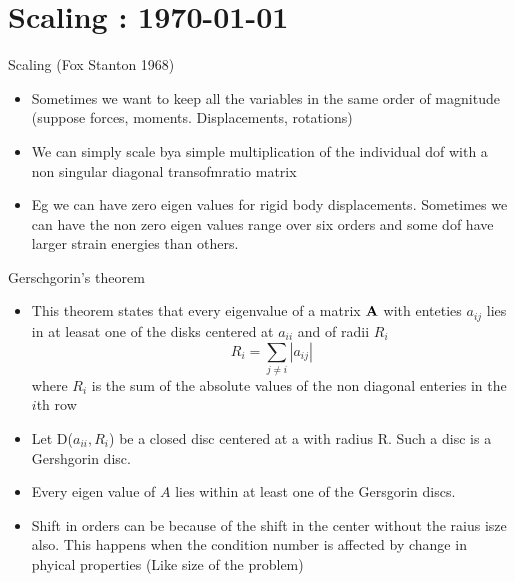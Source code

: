 




	\tableofcontents
	
\section{Scaling : \today}

	\begin{frame}{Scaling (Fox Stanton 1968)}
		\begin{itemize}
			\item Sometimes we want to keep all the variables in the same order of magnitude (suppose forces, moments. Displacements, rotations)
			\item We can simply scale  bya  simple multiplication of the individual dof with a non singular diagonal transofmratio matrix
			\item Eg we can have zero eigen values for rigid body displacements. Sometimes we can have the non zero eigen values range over six orders and some dof have larger strain energies than others.
		\end{itemize}
\texttt{}	\end{frame}

	\begin{frame}{Gerschgorin's theorem}
		\begin{itemize}
			\item This theorem states that every eigenvalue of a matrix $\mathbf{A}$ with enteties $a_{ij}$ lies in at leasat one of the disks centered at $a_{ii}$ and of radii $R_i$
			\begin{equation}
				R_i = \sum_{j\neq i } |a_{ij}|
			\end{equation}
			where $R_i$ is the sum of the absolute values of the non diagonal enteries in the $i$th row
			\item Let D($a_{ii},R_i$) be a closed disc centered at a with radius R. Such a disc is a Gershgorin disc. 
			\item Every eigen value of $A$ lies within at least one of the Gersgorin discs.
			\item Shift in orders can be because of the shift in the center without the raius isze also.  This happens when the condition number is affected by change in phyical properties (Like size of the problem) 
		\end{itemize}
	\end{frame}


